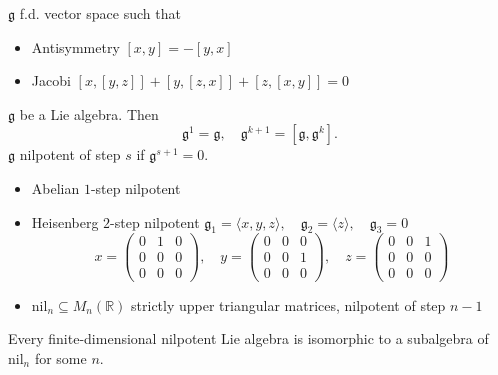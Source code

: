 \begin{definition} $\mathfrak{g}$ f.d. vector space such that
\begin{itemize}[topsep=-6pt, itemsep=0pt]
    \item Antisymmetry $[x,y] = -[y, x]$
    \item Jacobi $[x, [y, z]] + [y, [z, x]] + [z, [x, y]] = 0$
\end{itemize}
\end{definition}

\begin{definition} $\mathfrak{g}$ be a Lie algebra. Then
\[
\mathfrak{g}^1 = \mathfrak{g}, \quad \mathfrak{g}^{k+1} = [\mathfrak{g}, \mathfrak{g}^k].
\]
$\mathfrak{g}$ nilpotent of step $s$ if $\mathfrak{g}^{s+1} = 0$.
\end{definition}

\begin{example}
\begin{itemize}[topsep=-6pt, itemsep=0pt] We have
    \item Abelian $1$-step nilpotent
    \item Heisenberg $2$-step nilpotent $\mathfrak{g}_1 = \langle x, y, z \rangle, \quad  \mathfrak{g}_2 = \langle z \rangle, \quad  \mathfrak{g}_3 = 0$
    \[
    x = \begin{pmatrix}0 & 1 & 0 \\ 0 & 0 & 0 \\ 0 & 0 & 0 \end{pmatrix}, \quad y = \begin{pmatrix}0 & 0 & 0 \\ 0 & 0 & 1 \\ 0 & 0 & 0 \end{pmatrix}, \quad z = \begin{pmatrix}0 & 0 & 1 \\ 0 & 0 & 0 \\ 0 & 0 & 0 \end{pmatrix}
    \]
    \item $\text{nil}_n \subseteq M_n(\mathbb{R})$ strictly upper triangular matrices, nilpotent of step $n-1$
\end{itemize}
\end{example}

\begin{theorem} Every finite-dimensional nilpotent Lie algebra is isomorphic to a subalgebra of $\text{nil}_n$ for some $n$.
\end{theorem}

